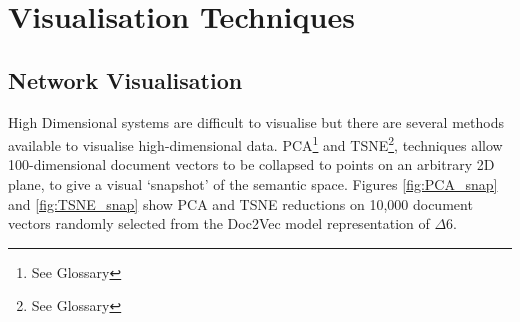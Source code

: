 \section{Visualisation Techniques}
\subsection{Network Visualisation}
High Dimensional systems are difficult to visualise but there are several methods available to visualise high-dimensional data. PCA\footnote{See Glossary} \cite{PCA} and TSNE\footnote{See Glossary}\cite{tsne1},\cite{bhtsne} techniques allow 100-dimensional document vectors to be collapsed to points on an arbitrary 2D plane, to give a visual `snapshot' of the semantic space. 
Figures \ref{fig:PCA_snap} and \ref{fig:TSNE_snap} show PCA and TSNE reductions on 10,000 document vectors randomly selected from the Doc2Vec model representation of $\Delta6$\cite{scikitlearn}.

